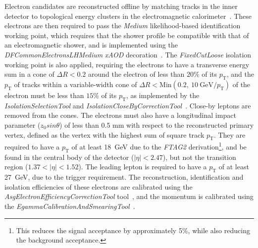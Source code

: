 \documentclass[NOTE, atlasdraft=true, texlive=2017, UKenglish]{\ATLASLATEXPATH atlasdoc}
\begin{document}
Electron candidates are reconstructed offline by matching tracks in the inner detector to topological energy clusters in the electromagnetic calorimeter~\cite{Aad:2014fxa}. These electrons are then required to pass the \emph{Medium} likelihood-based identification working point, which requires that the shower profile be compatible with that of an electromagnetic shower, and is implemented using the \emph{DFCommonElectronsLHMedium} \emph{xAOD} decoration~\cite{DFCommonElectronsLHMedium}. The \emph{FixedCutLoose} isolation working point is also applied, requiring the electrons to have a transverse energy sum in a cone of $\Delta R<0.2$ around the electron of less than $20\%$ of its $p_\text{T}$, and the $p_\text{T}$ of tracks within a variable-width cone of $\Delta R<\text{Min}(0.2,\ 10\ \text{GeV}/p_\text{T})$ of the electron must be less than $15\%$ of its $p_\text{T}$, as implemented by the \emph{IsolationSelectionTool} and \emph{IsolationCloseByCorrectionTool}~\cite{IsolationSelectionTool}. Close-by leptons are removed from the cones. The electrons must also have a longitudinal impact parameter ($z_0sin\theta$) of less than 0.5 mm with respect to the reconstructed primary vertex, defined as the vertex with the highest sum of square track $p_\text{T}$. They are required to have a $p_\text{T}$ of at least 18~GeV due to the \emph{FTAG2} derivation\footnote{\label{footnote18gevleptonptcuts}This reduces the signal acceptance by approximately 5\%, while also reducing the background acceptance.}, and be found in the central body of the detector ($\vert\eta\vert<2.47$), but not the transition region ($1.37<\vert\eta\vert<1.52$). The leading lepton is required to have a $p_\text{T}$ of at least 27~GeV, due to the trigger requirement. The reconstruction, identification and isolation efficiencies of these electrons are calibrated using the \emph{AsgElectronEfficiencyCorrectionTool} tool~\cite{AsgElectronEfficiencyCorrectionTool}, and the momentum is calibrated using the \emph{EgammaCalibrationAndSmearingTool}~\cite{EgammaCalibrationAndSmearingTool}.
\end{document}

